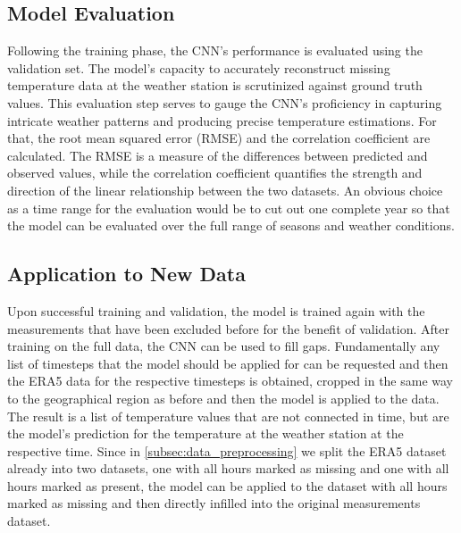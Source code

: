 \subsection{Model Evaluation}
Following the training phase, the CNN's performance is evaluated using the validation set. The model's capacity to accurately reconstruct missing temperature data at the weather station is scrutinized against ground truth values. This evaluation step serves to gauge the CNN's proficiency in capturing intricate weather patterns and producing precise temperature estimations. For that, the root mean squared error (RMSE) and the correlation coefficient are calculated. The RMSE is a measure of the differences between predicted and observed values, while the correlation coefficient quantifies the strength and direction of the linear relationship between the two datasets. An obvious choice as a time range for the evaluation would be to cut out one complete year so that the model can be evaluated over the full range of seasons and weather conditions. 

\subsection{Application to New Data}
Upon successful training and validation, the model is trained again with the measurements that have been excluded before for the benefit of validation. After training on the full data, the CNN can be used to fill gaps. Fundamentally any list of timesteps that the model should be applied for can be requested and then the ERA5 data for the respective timesteps is obtained, cropped in the same way to the geographical region as before and then the model is applied to the data. The result is a list of temperature values that are not connected in time, but are the model's prediction for the temperature at the weather station at the respective time. Since in \ref{subsec:data_preprocessing} we split the ERA5 dataset already into two datasets, one with all hours marked as missing and one with all hours marked as present, the model can be applied to the dataset with all hours marked as missing and then directly infilled into the original measurements dataset.